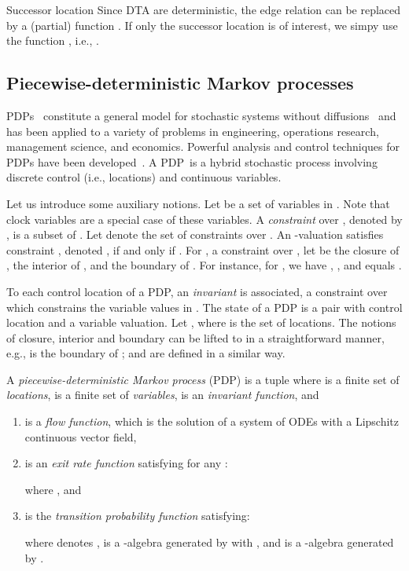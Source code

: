 \documentclass{LMCS}
\newcommand{\<}{\langle}
\renewcommand{\>}{\rangle}
\newcommand{\PDP}{\textsc{PDP}}
\begin{document}
\begin{rem}Successor location
Since DTA are deterministic, the edge relation  can be replaced
by a (partial) function .
If only the successor location is of interest, we simpy use the function
, i.e., .
\end{rem}

\subsection{Piecewise-deterministic Markov processes}\label{sec:PDP}

PDPs~\cite{Dav84} constitute a general model for stochastic systems without
diffusions~\cite{Dav93} and has been applied to a variety of problems in
engineering, operations research, management science, and economics.
Powerful analysis and control techniques for PDPs have been developed~\cite{Len85,Len91,Cos88}.
A \PDP\ is a hybrid stochastic process involving discrete control (i.e.,
locations) and continuous variables.

Let us introduce some auxiliary notions.
Let  be a set of variables in .
Note that clock variables are a special case of these variables.
A \emph{constraint} over , denoted by , is a subset of .
Let  denote the set of constraints over .
An -valuation  satisfies constraint , denoted , if and only if .
For , a constraint over , let  be the closure of ,  the interior
of , and  the boundary
of .
For instance, for , we have
, , and  equals .

To each control location  of a PDP, an \emph{invariant}  is associated,
a constraint over  which constrains the variable values in .
The state of a PDP is a pair  with control location  and 
a variable valuation.
Let ,
where  is the set of locations.
The notions of closure, interior and boundary can be lifted to  in
a straightforward manner, e.g.,  is the boundary of ; 
and  are defined in a similar way.
\begin{defi}[\PDP\,\cite{Dav93}]
A \emph{piecewise-deterministic Markov process} (PDP) is a tuple  where  is a finite set of
\emph{locations},  is a finite set of \emph{variables},  is an \emph{invariant function}, and
\begin{enumerate}[]
\item
 is a \emph{flow
function}, which is the solution of a system of ODEs with a Lipschitz continuous vector
field,
\item
 is an \emph{exit rate function}
satisfying for any :

where ,  and
\item 
is the \emph{transition probability function} satisfying:

where  denotes ,  is a -algebra
generated by  with , and
 is a -algebra generated by .
\end{enumerate}
\end{defi}
\end{document}
